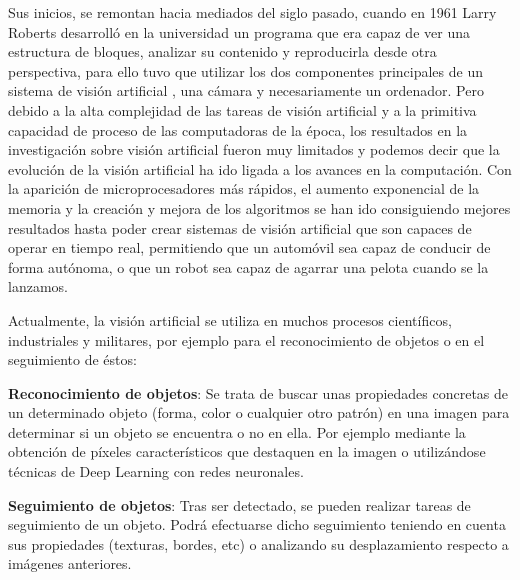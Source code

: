Sus inicios, se remontan hacia mediados del siglo pasado, cuando en 1961 Larry Roberts desarrolló en la universidad un programa que era capaz de ver una estructura de bloques, analizar su contenido y reproducirla desde otra perspectiva, para ello tuvo que utilizar los dos componentes principales de un sistema de visión artificial , una cámara y necesariamente un ordenador. Pero debido a la alta complejidad de las tareas de visión artificial y a la primitiva capacidad de proceso  de las computadoras de la época, los resultados en la investigación sobre visión artificial fueron muy limitados y podemos decir que la evolución de la visión artificial ha ido ligada a los avances en la computación. Con la aparición de microprocesadores más rápidos, el aumento exponencial de la memoria y la creación y mejora de los algoritmos  se han ido consiguiendo mejores resultados hasta poder crear sistemas de visión artificial que son capaces de operar en tiempo real, permitiendo que un automóvil sea capaz de conducir de forma autónoma, o que un robot sea capaz de agarrar una pelota cuando se la lanzamos.

Actualmente, la visión artificial se utiliza en muchos procesos científicos, industriales y militares, por ejemplo para el reconocimiento de objetos o en el seguimiento de éstos:

	\textbf{Reconocimiento de objetos}: Se trata de buscar unas propiedades concretas de un determinado objeto (forma, color o cualquier otro patrón) en una imagen para determinar si un objeto se encuentra o no en ella. Por ejemplo mediante la obtención de píxeles característicos que destaquen en la imagen o utilizándose técnicas de Deep Learning con redes neuronales.

	\textbf{Seguimiento de objetos}: Tras ser detectado, se pueden realizar tareas de seguimiento de un objeto. Podrá efectuarse dicho seguimiento teniendo en cuenta sus propiedades (texturas, bordes, etc) o analizando su desplazamiento respecto a imágenes anteriores.

